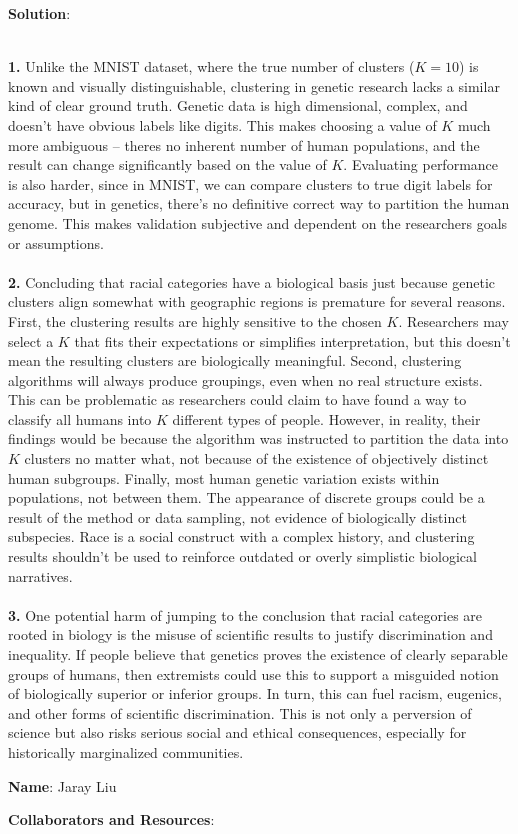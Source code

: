 \documentclass[submit]{../harvardml}
\newenvironment{solution}{
    \vspace{2mm}
    \color{blue}\noindent\textbf{Solution}:
}{}
\begin{document}
\begin{solution}
    \\
    \textbf{1.} Unlike the MNIST dataset, where the true number of clusters ($K=10$) is known and visually distinguishable, clustering in genetic research lacks a similar kind of clear ground truth. Genetic data is high dimensional, complex, and doesn't have obvious labels like digits. This makes choosing a value of $K$ much more ambiguous -- theres no inherent number of human populations, and the result can change significantly based on the value of $K$. Evaluating performance is also harder, since in MNIST, we can compare clusters to true digit labels for accuracy, but in genetics, there’s no definitive correct way to partition the human genome. This makes validation subjective and dependent on the researchers goals or assumptions.
    \\
    \\
    \textbf{2.} Concluding that racial categories have a biological basis just because genetic clusters align somewhat with geographic regions is premature for several reasons. First, the clustering results are highly sensitive to the chosen $K$. Researchers may select a $K$ that fits their expectations or simplifies interpretation, but this doesn’t mean the resulting clusters are biologically meaningful. Second, clustering algorithms will always produce groupings, even when no real structure exists. This can be problematic as researchers could claim to have found a way to classify all humans into $K$ different types of people. However, in reality, their findings would be because the algorithm was instructed to partition the data into $K$ clusters no matter what, not because of the existence of objectively distinct human subgroups. Finally, most human genetic variation exists within populations, not between them. The appearance of discrete groups could be a result of the method or data sampling, not evidence of biologically distinct subspecies. Race is a social construct with a complex history, and clustering results shouldn’t be used to reinforce outdated or overly simplistic biological narratives.
    \\
    \\
    \textbf{3.} One potential harm of jumping to the conclusion that racial categories are rooted in biology is the misuse of scientific results to justify discrimination and inequality. If people believe that genetics proves the existence of clearly separable groups of humans, then extremists could use this to support a misguided notion of biologically superior or inferior groups. In turn, this can fuel racism, eugenics, and other forms of scientific discrimination. This is not only a perversion of science but also risks serious social and ethical consequences, especially for historically marginalized communities.
\end{solution}

\newpage

\textbf{Name}: Jaray Liu

\textbf{Collaborators and Resources}: 
\end{document}
